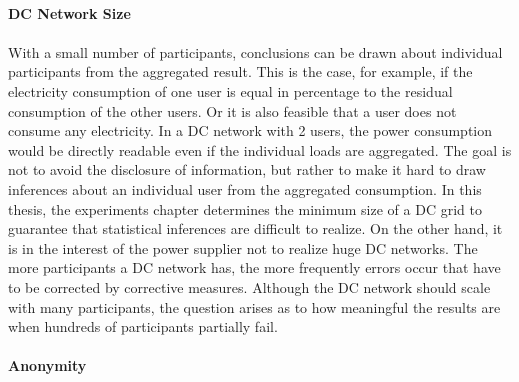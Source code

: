 \\ 
\textbf{DC Network Size}
\\
\\
With a small number of participants, conclusions can be drawn about individual participants from the aggregated result. This is the case, for example, if the electricity consumption of one user is equal in percentage to the residual consumption of the other users. Or it is also feasible that a user does not consume any electricity. In a DC network with 2 users, the power consumption would be directly readable even if the individual loads are aggregated. The goal is not to avoid the disclosure of information, but rather to make it hard to draw inferences about an individual user from the aggregated consumption.%
In this thesis, the experiments chapter determines the minimum size of a DC grid to guarantee that statistical inferences are difficult to realize.
On the other hand, it is in the interest of the power supplier not to realize huge DC networks. The more participants a DC network has, the more frequently errors occur that have to be corrected by corrective measures. Although the DC network should scale with many participants, the question arises as to how meaningful the results are when hundreds of participants partially fail.%
\\
\\ 
\textbf{Anonymity}
\\
\\
